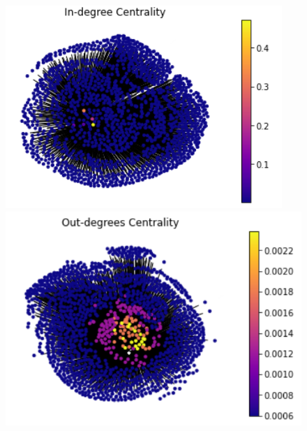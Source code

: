 \documentclass[a4paper,11pt]{report}
\begin{document}
	\begin{figure}[h]
		\includegraphics[width=.49\textwidth]{in-degree}\hfill
		\includegraphics[width=.49\textwidth]{out-degree}
	\end{figure}
\end{document}
